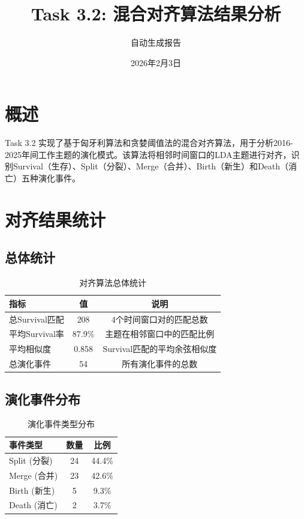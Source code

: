 \documentclass{article}
\title{Task 3.2: 混合对齐算法结果分析}
\author{自动生成报告}
\date{2026年2月3日}
\begin{document}
\maketitle

\section{概述}

Task 3.2 实现了基于匈牙利算法和贪婪阈值法的混合对齐算法，用于分析2016-2025年间工作主题的演化模式。该算法将相邻时间窗口的LDA主题进行对齐，识别Survival（生存）、Split（分裂）、Merge（合并）、Birth（新生）和Death（消亡）五种演化事件。

\section{对齐结果统计}

\subsection{总体统计}

\begin{table}[H]
\centering
\caption{对齐算法总体统计}
\label{tab:overall_stats}
\begin{tabular}{@{}lcc@{}}
\toprule
指标 & 值 & 说明 \\
\midrule
总Survival匹配 & 208 & 4个时间窗口对的匹配总数 \\
平均Survival率 & 87.9\% & 主题在相邻窗口中的匹配比例 \\
平均相似度 & 0.858 & Survival匹配的平均余弦相似度 \\
总演化事件 & 54 & 所有演化事件的总数 \\
\bottomrule
\end{tabular}
\end{table}

\subsection{演化事件分布}

\begin{table}[H]
\centering
\caption{演化事件类型分布}
\label{tab:event_distribution}
\begin{tabular}{@{}lcc@{}}
\toprule
事件类型 & 数量 & 比例 \\
\midrule
Split (分裂) & 24 & 44.4\% \\
Merge (合并) & 23 & 42.6\% \\
Birth (新生) & 5 & 9.3\% \\
Death (消亡) & 2 & 3.7\% \\
\bottomrule
\end{tabular}
\end{table}
\end{document}
